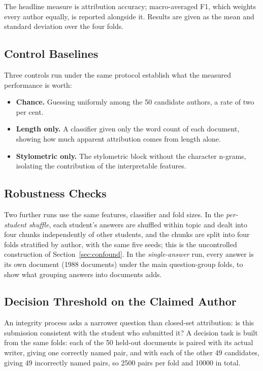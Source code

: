 \documentclass[runningheads]{llncs}
\begin{document}
The headline measure is attribution accuracy; macro-averaged F1, which weights every author equally, is reported alongside it. Results are given as the mean and standard deviation over the four folds.

\subsection{Control Baselines}

Three controls run under the same protocol establish what the measured performance is worth:

\begin{itemize}
\item \textbf{Chance.} Guessing uniformly among the 50 candidate authors, a rate of two per cent.
\item \textbf{Length only.} A classifier given only the word count of each document, showing how much apparent attribution comes from length alone.
\item \textbf{Stylometric only.} The stylometric block without the character n-grams, isolating the contribution of the interpretable features.
\end{itemize}

\subsection{Robustness Checks}
\label{sec:robust}

Two further runs use the same features, classifier and fold sizes. In the \emph{per-student shuffle}, each student's answers are shuffled within topic and dealt into four chunks independently of other students, and the chunks are split into four folds stratified by author, with the same five seeds; this is the uncontrolled construction of Section~\ref{sec:confound}. In the \emph{single-answer} run, every answer is its own document (1988 documents) under the main question-group folds, to show what grouping answers into documents adds.

\subsection{Decision Threshold on the Claimed Author}
\label{sec:verification}

An integrity process asks a narrower question than closed-set attribution: is this submission consistent with the student who submitted it? A decision task is built from the same folds: each of the 50 held-out documents is paired with its actual writer, giving one correctly named pair, and with each of the other 49 candidates, giving 49 incorrectly named pairs, so 2500 pairs per fold and 10000 in total.
\end{document}
